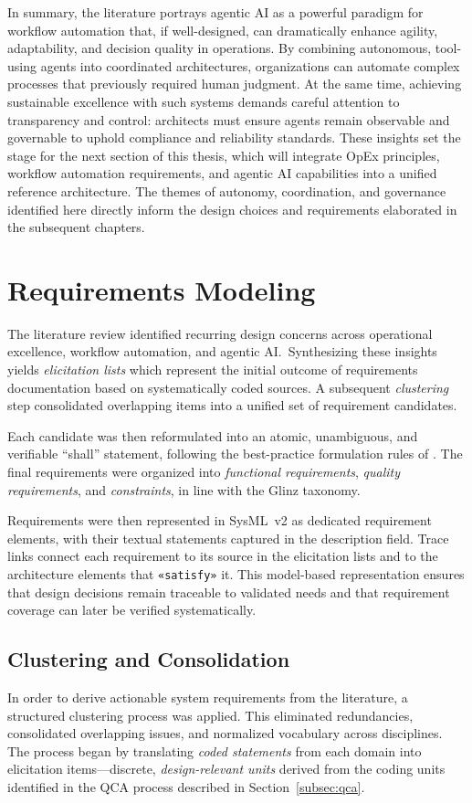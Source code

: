 In summary, the literature portrays agentic AI as a powerful paradigm for workflow automation that, if well-designed, can dramatically enhance agility, adaptability, and decision quality in operations. By combining autonomous, tool-using agents into coordinated architectures, organizations can automate complex processes that previously required human judgment. At the same time, achieving sustainable excellence with such systems demands careful attention to transparency and control: architects must ensure agents remain observable and governable to uphold compliance and reliability standards. These insights set the stage for the next section of this thesis, which will integrate OpEx principles, workflow automation requirements, and agentic AI capabilities into a unified reference architecture. The themes of autonomy, coordination, and governance identified here directly inform the design choices and requirements elaborated in the subsequent chapters.

\section{Requirements Modeling}\label{sec:mod-req}
The literature review identified recurring design concerns across operational excellence, workflow automation, and agentic AI.~Synthesizing these insights yields \emph{elicitation lists} which represent the initial outcome of requirements documentation based on systematically coded sources. A subsequent \emph{clustering} step consolidated overlapping items into a unified set of requirement candidates.

Each candidate was then reformulated into an atomic, unambiguous, and verifiable “shall” statement, following the best-practice formulation rules of \textcite{glinzHandbook2020}. The final requirements were organized into \emph{functional requirements}, \emph{quality requirements}, and \emph{constraints}, in line with the Glinz taxonomy.

Requirements were then represented in SysML~v2 as dedicated requirement elements, with their textual statements captured in the description field. Trace links connect each requirement to its source in the elicitation lists and to the architecture elements that \texttt{«satisfy»} it. This model-based representation ensures that design decisions remain traceable to validated needs and that requirement coverage can later be verified systematically. \\

\subsection{Clustering and Consolidation}
In order to derive actionable system requirements from the literature, a structured clustering process was applied. This eliminated redundancies, consolidated overlapping issues, and normalized vocabulary across disciplines. The process began by translating \emph{coded statements} from each domain into elicitation items—discrete, \emph{design-relevant units} derived from the coding units identified in the QCA process described in Section~\ref{subsec:qca}.~\\

